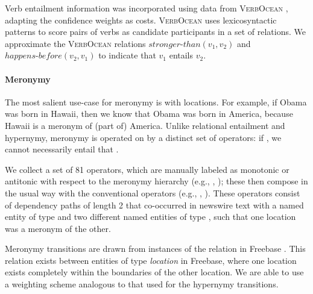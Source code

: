 Verb entailment information was incorporated using data from \textsc{VerbOcean}
 \cite{key:2004chklovski-verbocean}, adapting the confidence weights as costs.
\textsc{VerbOcean} uses lexicosyntactic patterns to score pairs of verbs as candidate participants in a set of relations.
We approximate the \textsc{VerbOcean} relations $\mathit{stronger\text{-}than}(v_1,v_2)$ and $\mathit{happens\text{-}before}(v_2,v_1)$ to indicate that $v_1$ entails $v_2$.

\paragraph{Meronymy}
The most salient use-case for meronymy is with locations.
For example, if Obama was born in Hawaii, then we know that Obama was born in
  America, because Hawaii is a meronym of (part of) America.
Unlike relational entailment and hypernymy, meronymy is operated on by a
  distinct set of operators:
  if , we cannot necessarily entail that .


We collect a set of 81 operators, which are manually labeled as monotonic or antitonic with respect
  to the meronymy hierarchy (e.g., , ); 
  these then compose in the usual way with the conventional 
  operators (e.g., , ).
These operators consist of dependency paths of length 2 
that co-occurred in newswire text with a named entity of type 
 and two different named entities of type , 
such that one location was a meronym of the other.

Meronymy transitions are drawn from instances of the relation  in Freebase \cite{key:2008bollacker-freebase}.
This relation exists between entities of type \textit{location} in Freebase, where one location exists completely within the boundaries of the other location.
We are able to use a weighting scheme analogous to that used for the hypernymy transitions.

